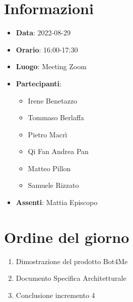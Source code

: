 \section{Informazioni}
	\begin{itemize}
		\item \textbf{Data}: 2022-08-29     %
		\item \textbf{Orario}: 16:00-17:30  %
		\item \textbf{Luogo}: Meeting Zoom
		\item \textbf{Partecipanti}:
		\begin{itemize}
			\item Irene Benetazzo
			\item Tommaso Berlaffa
			\item Pietro Macrì
			\item Qi Fan Andrea Pan
			\item Matteo Pillon
			\item Samuele Rizzato
		\end{itemize}
        \item \textbf{Assenti}: Mattia Episcopo
	\end{itemize}
    
	\section{Ordine del giorno}
	\begin{enumerate}
		\item Dimostrazione del prodotto Bot4Me
		\item Documento Specifica Architetturale
		\item Conclusione incremento 4
	\end{enumerate}
\newpage